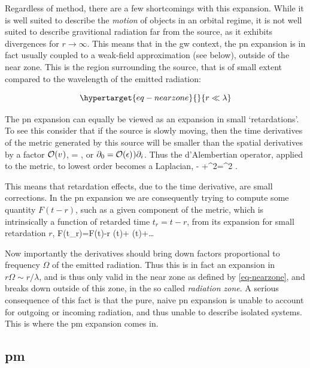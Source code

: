 \documentclass[
  10pt,
  a4paper,
  DIV=11,
  numbers=noendperiod,
  oneside]{scrreprt}
\let\[\relax \let\]\relax %
\DeclareRobustCommand{\[}{\begin{equation}}
\DeclareRobustCommand{\]}{\end{equation}}
\begin{document}
Regardless of method, there are a few shortcomings with this expansion.
While it is well suited to describe the \emph{motion} of objects in an
orbital regime, it is not well suited to describe gravitional radiation
far from the source, as it exhibits divergences for
\(r\to\infty\).
This means that in the \gls{gw} context, the \gls{pn} expansion is in
fact usually coupled to a weak-field approximation (see below), outside
of the near zone. This is the region surrounding the source, that is of
small extent compared to the wavelength of the emitted radiation:

\begin{equation}\protect\hypertarget{eq-nearzone}{}{
r \ll \lambda
}\label{eq-nearzone}\end{equation}

The \gls{pn} expansion can equally be viewed as an expansion in small
`retardations'. To see this consider that if the source is slowly
moving, then the time derivatives of the metric generated by this source
will be smaller than the spatial derivatives by a factor \(\mathcal{O}(v^{})\),
\[
= ,
\] or \(\partial_0=\mathcal{O}(\epsilon)^{}) \partial_i\). Thus the
d'Alembertian operator, applied to the metric, to lowest order becomes a
Laplacian, \[
- +\nabla^2= \nabla^2 .
\]

This means that retardation effects, due to the time derivative, are
small corrections. In the \gls{pn} expansion we are consequently trying
to compute some quantity \(F(t-r)\), such as a given component of the
metric, which is intrinsically a function of retarded time \(t_r=t-r\),
from its expansion for small retardation \(r\), \[
F(t_r)=F(t)-{r} (t)+ (t)+\ldots
\]

Now importantly the derivatives should bring down factors proportional
to frequency \(\Omega\) of the emitted radiation. Thus this is in fact
an expansion in \(r \Omega\sim r / \lambda\), and is thus only valid in
the near zone as defined by \ref{eq-nearzone}, and breaks down outside
of this zone, in the so called \emph{radiation zone}. A serious
consequence of this fact is that the pure, naive \gls{pn} expansion is
unable to account for outgoing or incoming radiation, and thus unable to
describe isolated systems. This is where the \gls{pm} expansion comes
in.

\hypertarget{pm}{%
\subsection{\texorpdfstring{\gls{pm}}{}}\label{pm}}
\end{document}
